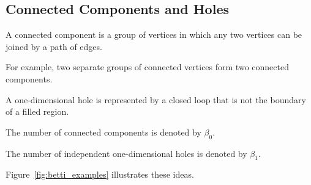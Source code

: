 \documentclass[oneside,english,11pt]{article}
\begin{document}
\subsection{Connected Components and Holes}

A connected component is a group of vertices
in which any two vertices can be joined by
a path of edges.

For example, two separate groups of connected
vertices form two connected components.

A one-dimensional hole is represented by a
closed loop that is not the boundary of a
filled region.

The number of connected components is
denoted by $\beta_0$.

The number of independent one-dimensional
holes is denoted by $\beta_1$.

Figure~\ref{fig:betti_examples} illustrates
these ideas.
\end{document}
